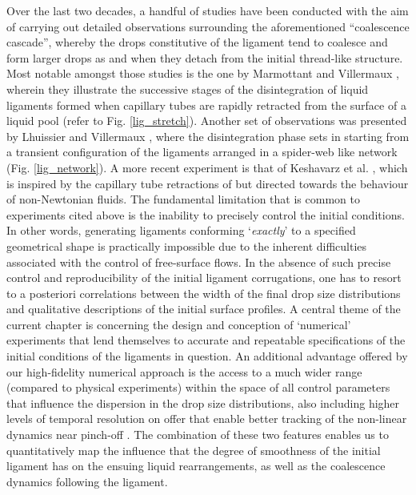 Over the last two decades, a handful of studies have been conducted 
with the aim of carrying out detailed observations surrounding 
the aforementioned ``coalescence cascade'', whereby the drops 
constitutive of the ligament tend to coalesce and form larger drops
as and when they detach from the initial thread-like structure.
Most notable amongst those studies is the one by Marmottant and Villermaux \cite{vill_3},
wherein they illustrate the successive stages of the disintegration of 
liquid ligaments formed when capillary tubes are rapidly retracted from 
the surface of a liquid pool (refer to Fig. \ref{lig_stretch}). 
Another set of observations was presented by Lhuissier and Villermaux \cite{sheet_hole},
where the disintegration phase sets in starting from a transient configuration
of the ligaments arranged in a spider-web like network (Fig. \ref{lig_network}).  
A more recent experiment is that of Keshavarz et al. \cite{mckinley},
which is inspired by the capillary tube retractions of \cite{vill_3} 
but directed towards the behaviour of non-Newtonian fluids.
The fundamental limitation that is common to experiments cited above 
is the inability to precisely control the initial conditions.
In other words, generating ligaments conforming `\textit{exactly}'
to a specified geometrical shape is practically impossible 
due to the inherent difficulties associated with the control of free-surface flows.  
In the absence of such precise control and reproducibility of the initial 
ligament corrugations, one has to resort to a posteriori correlations between 
the width of the final drop size distributions and qualitative descriptions 
of the initial surface profiles.
A central theme of the current chapter is concerning the design and conception
of `numerical' experiments that lend themselves to accurate and repeatable 
specifications of the initial conditions of the ligaments in question.  
An additional advantage offered by our high-fidelity numerical approach 
is the access to a much wider range (compared to physical experiments) within the 
space of all control parameters that influence the dispersion in the drop size distributions, 
also including higher levels of temporal resolution on offer 
that enable better tracking of the non-linear dynamics near pinch-off
. 
The combination of these two features enables us to quantitatively map the 
influence that the degree of smoothness of the initial ligament has on the ensuing 
liquid rearrangements, as well as the coalescence dynamics following the ligament. 

